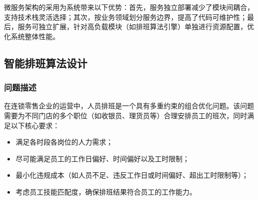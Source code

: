 \documentclass{ctexart}
\begin{document}
微服务架构的采用为系统带来以下优势：首先，服务独立部署减少了模块间耦合，支持技术栈灵活选择；其次，按业务领域划分服务边界，提高了代码可维护性；最后，服务可独立扩展，针对高负载模块（如排班算法引擎）单独进行资源配置，优化系统整体性能。

\subsection{智能排班算法设计}
\subsubsection{问题描述}

在连锁零售企业的运营中，人员排班是一个具有多重约束的组合优化问题。该问题需要为不同门店的多个职位（如收银员、理货员等）合理安排员工的班次，同时满足以下核心要求：
\begin{itemize}
    \item 满足各时段各岗位的人力需求；
    \item 尽可能满足员工的工作日偏好、时间偏好以及工时限制；
    \item 最小化违规成本（如人员不足、违反工作日或时间偏好、超出工时限制等）；
    \item 考虑员工技能匹配度，确保排班结果符合员工的工作能力。
\end{itemize}

    
    
\end{document}
